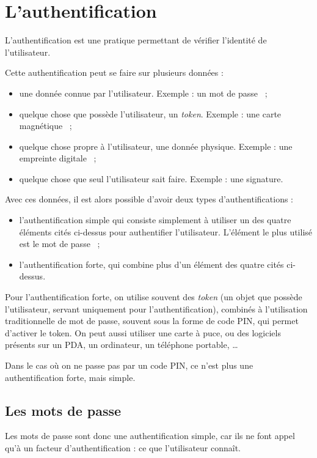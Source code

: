 \section{L'authentification\label{sec:Authentification}}
L'authentification est une pratique permettant de vérifier
l'identité de l'utilisateur.

Cette authentification peut se faire sur plusieurs données : 
\begin{itemize}
  \item une donnée connue par l'utilisateur. Exemple : un mot de
passe ~;
  \item quelque chose que possède l'utilisateur, un \emph{token}.
Exemple : une carte magnétique ~;
  \item quelque chose propre à l'utilisateur, une donnée physique.
Exemple : une empreinte digitale ~;
  \item quelque chose que seul l'utilisateur sait faire. Exemple :
une signature.
\end{itemize}

Avec ces données, il est alors possible d'avoir deux types
d'authentifications : 
\begin{itemize}
  \item l'authentification simple qui consiste simplement à
utiliser un des quatre éléments cités ci-dessus pour authentifier
l'utilisateur. L'élément le plus utilisé est le mot de passe ~;
  \item l'authentification forte, qui combine plus d'un élément
des quatre cités ci-dessus.
\\
\end{itemize}

Pour l'authentification forte, on utilise souvent des
\emph{token} (un objet que possède l'utilisateur, servant
uniquement pour l'authentification), 
combinés à l'utilisation traditionnelle de mot de passe, souvent
sous la forme de code PIN, qui permet d'activer le token.
On peut aussi utiliser une carte à puce, ou des logiciels présents
sur un PDA, un ordinateur, un téléphone portable, …

Dans le cas où on ne passe pas par un code PIN, ce n'est plus une
authentification forte, mais simple.

\subsection{Les mots de passe}
Les mots de passe sont donc une authentification simple, car ils
ne font appel qu'à un facteur d'authentification : ce que
l'utilisateur connaît. 

